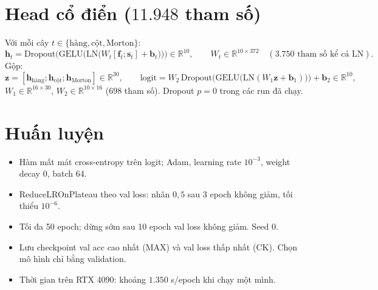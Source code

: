 \documentclass[11pt,a4paper]{article}
\newcommand{\RR}{\mathbb{R}}
\begin{document}
\section{Head cổ điển ($11.948$ tham số)}
Với mỗi cây $t\in\{\text{hàng},\text{cột},\text{Morton}\}$:
\begin{equation}
\bm h_t = \mathrm{Dropout}\Big(\mathrm{GELU}\big(\mathrm{LN}\big(W_t[\bm f_t;\bm s_t]+\bm b_t\big)\big)\Big) \in \RR^{10},
\qquad W_t\in\RR^{10\times372}\quad(3.750 \text{ tham số kể cả LN}).
\end{equation}
Gộp:
\begin{equation}
\bm z = [\bm h_{\text{hàng}};\bm h_{\text{cột}};\bm h_{\text{Morton}}]\in\RR^{30},\qquad
\text{logit} = W_2\,\mathrm{Dropout}\Big(\mathrm{GELU}\big(\mathrm{LN}(W_1\bm z+\bm b_1)\big)\Big)+\bm b_2 \in\RR^{10},
\end{equation}
$W_1\in\RR^{16\times30}$, $W_2\in\RR^{10\times16}$ ($698$ tham số). Dropout $p=0$ trong các run đã chạy.

\section{Huấn luyện}
\begin{itemize}[nosep]
\item Hàm mất mát cross-entropy trên logit; Adam, learning rate $10^{-3}$, weight decay $0$, batch 64.
\item ReduceLROnPlateau theo val loss: nhân $0{,}5$ sau 3 epoch không giảm, tối thiểu $10^{-6}$.
\item Tối đa 50 epoch; dừng sớm sau 10 epoch val loss không giảm. Seed 0.
\item Lưu checkpoint val acc cao nhất (MAX) và val loss thấp nhất (CK). Chọn mô hình chỉ bằng validation.
\item Thời gian trên RTX 4090: khoảng $1.350$ s/epoch khi chạy một mình.
\end{itemize}

\end{document}
